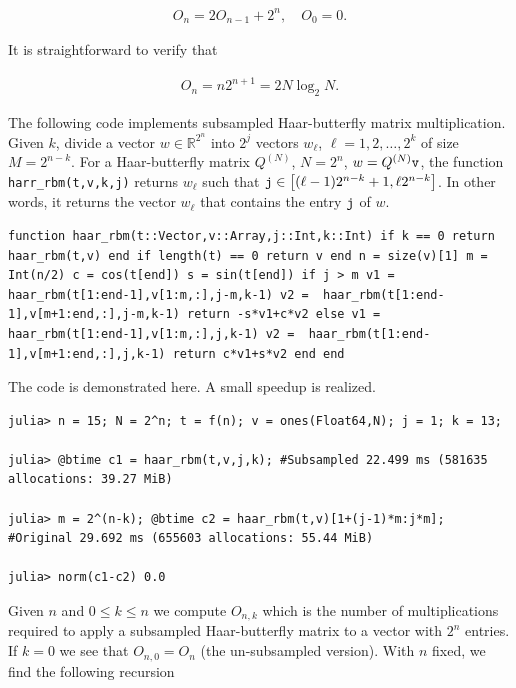 \begin{align}
  O_n = 2 O_{n-1} + 2^{n}, \quad O_0 = 0.
\end{align}

It is straightforward to verify that

\begin{align}\label{e:iter-haar}
  O_n = n 2^{n+1} = 2N \log_2 N.
\end{align}

\newcommand{\mtt}[1]{\text{\tt#1}}

The following code implements subsampled Haar-butterfly matrix multiplication.  Given $k$, divide a vector $w \in \mathbb R^{2^n}$ into $2^j$ vectors $w_\ell$, $\ell = 1,2,\ldots,2^k$ of size $M = 2^{n-k}$.  For a Haar-butterfly matrix $Q^{(N)}$, $N = 2^n$, $w = Q^{(N)}\mtt v$, the function {\tt harr\_rbm(t,v,k,j)} returns $w_\ell$ such that $\mtt j \in \left[(\ell-1) 2^{n-k} + 1, \ell 2^{n-k}\right]$.  In other words, it returns the vector $w_\ell$ that contains the entry $\mtt j$ of $w$.

\begin{lstlisting}[linewidth = \linewidth,frame = trBL] function haar_rbm(t::Vector,v::Array,j::Int,k::Int) if k == 0 return haar_rbm(t,v) end if length(t) == 0 return v end n = size(v)[1] m = Int(n/2) c = cos(t[end]) s = sin(t[end]) if j > m v1 =  haar_rbm(t[1:end-1],v[1:m,:],j-m,k-1) v2 =  haar_rbm(t[1:end-1],v[m+1:end,:],j-m,k-1) return -s*v1+c*v2 else v1 =  haar_rbm(t[1:end-1],v[1:m,:],j,k-1) v2 =  haar_rbm(t[1:end-1],v[m+1:end,:],j,k-1) return c*v1+s*v2 end end
\end{lstlisting}

The code is demonstrated here.  A small speedup is realized.

\begin{lstlisting}[linewidth = \linewidth,frame = trBL] julia> n = 15; N = 2^n; t = f(n); v = ones(Float64,N); j = 1; k = 13;

julia> @btime c1 = haar_rbm(t,v,j,k); #Subsampled 22.499 ms (581635 allocations: 39.27 MiB)

julia> m = 2^(n-k); @btime c2 = haar_rbm(t,v)[1+(j-1)*m:j*m]; #Original 29.692 ms (655603 allocations: 55.44 MiB)

julia> norm(c1-c2) 0.0
\end{lstlisting}

Given $n$ and $0 \leq k \leq n$ we compute $O_{n,k}$ which is the number of multiplications required to apply a subsampled Haar-butterfly matrix to a vector with $2^n$ entries.  If $k = 0$ we see that $O_{n,0} = O_n$ (the un-subsampled version).  With $n$ fixed, we find the following recursion

